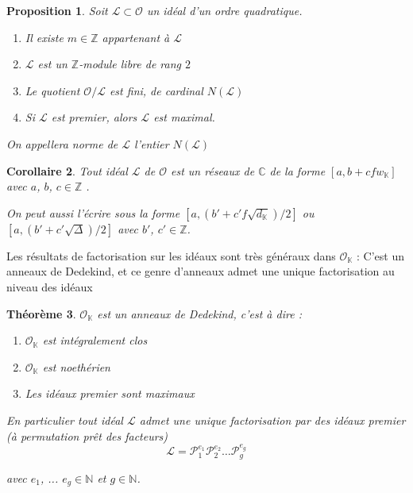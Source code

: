 \documentclass{article}
\newcommand{\N}[0]{\mathbb{N}}
\newcommand{\Z}[0]{\mathbb{Z}}
\newcommand{\C}[0]{\mathbb{C}}
\newcommand{\K}[0]{\mathbb{K}}
\newcommand{\OR}[0]{\mathcal{O}}
\newcommand{\LR}[0]{\mathcal{L}}
\newcommand{\PR}[0]{\mathcal{P}}
\newtheorem{The}{Théorème}[section]
\newtheorem{Prop}[The]{Proposition}
\newtheorem{Coro}[The]{Corollaire}
\begin{document}
\begin{Prop}
	
	Soit $\LR\subset\OR$ un idéal d'un ordre quadratique.
	
	\begin{enumerate}
		\item Il existe $m\in\Z$ appartenant à $\LR$
		\item $\LR$ est un $\Z$-module libre de rang $2$
		\item Le quotient $\OR/\LR$ est fini, de cardinal $N(\LR)$
		\item Si $\LR$ est premier, alors $\LR$ est maximal. 
	\end{enumerate}
	
	On appellera norme de $\LR$ l'entier $N(\LR)$
	
\end{Prop}

\begin{Coro}
	Tout idéal $\LR$ de $\OR$ est un réseaux de $\C$ de la forme $\left[ a, b + cfw_{\K}\right]$ avec $a$, $b$, $c\in\Z$ . 
	
	On peut aussi l'écrire sous la forme $\left[ a, (b' + c'f\sqrt{d_{\K}})/2\right]$ ou $\left[ a, (b' + c'\sqrt{\Delta})/2\right]$ avec $b'$, $c'\in\Z$.
\end{Coro}

Les résultats de factorisation sur les idéaux sont très généraux dans $\OR_{\K}$ : C'est un anneaux de Dedekind, et ce genre d'anneaux admet une unique factorisation au niveau des idéaux

\begin{The}
	$\OR_{\K}$ est un anneaux de Dedekind, c'est à dire :
	\begin{enumerate}
		\item $\OR_{\K}$ est intégralement clos
		\item $\OR_{\K}$ est noethérien
		\item Les idéaux premier sont maximaux 
	\end{enumerate}
	
	En particulier tout idéal $\LR$ admet une unique factorisation par des idéaux premier (à permutation prêt des facteurs)
	\begin{equation*}
		\LR = \PR_{1}^{e_{1}}\PR_{2}^{e_{2}}\ldots\PR_{g}^{e_{g}}
	\end{equation*}
	
	avec $e_{1}$, ... $e_{g}\in\N$ et $g\in\N$.
	
\end{The}
\end{document}
